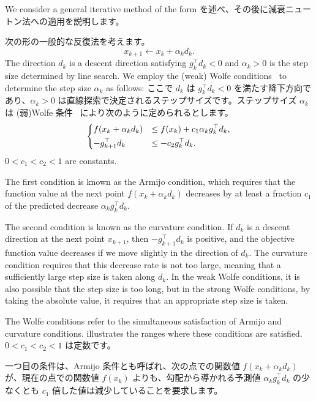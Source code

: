 \documentclass[0_main]{subfiles}
\begin{document}
    We consider a general iterative method of the form
\else
    を述べ、その後に減衰ニュートン法への適用を説明します。

    次の形の一般的な反復法を考えます。
\fi
\begin{equation*}
    x_{k+1} \gets x_k + \alpha_k d_k.
\end{equation*}
\ifEn
    The direction $d_k$ is a descent direction satisfying $g_k^\top d_k < 0$ and $\alpha_k > 0$ is the step size determined by line search. We employ the (weak) Wolfe conditions~\citep[Sec. 3.1]{nocedal1999numerical} to determine the step size $\alpha_k$ as follows:
\else
    ここで $d_k$ は $g_k^\top d_k < 0$ を満たす降下方向であり、$\alpha_k > 0$ は直線探索で決定されるステップサイズです。ステップサイズ $\alpha_k$ は (弱)Wolfe 条件~\citep[Sec. 3.1]{nocedal1999numerical} により次のように定められるとします。
\fi
\begin{equation*}
    \begin{dcases}
        f(x_k + \alpha_k d_k) & \leq f(x_k) + c_1 \alpha_k g_k^\top d_k, \\
        -g_{k+1}^\top d_k     & \leq -c_2 g_k^\top d_k.
    \end{dcases}
\end{equation*}
\ifEn
    $0 < c_1 < c_2 < 1$ are constants.

    The first condition is known as the Armijo condition, which requires that the function value at the next point $f(x_k + \alpha_k d_k)$ decreases by at least a fraction $c_1$ of the predicted decrease $\alpha_k g_k^\top d_k$.

    The second condition is known as the curvature condition. If $d_k$ is a descent direction at the next point $x_{k+1}$, then $-g_{k+1}^\top d_k$ is positive, and the objective function value decreases if we move slightly in the direction of $d_k$. The curvature condition requires that this decrease rate is not too large, meaning that a sufficiently large step size is taken along $d_k$. In the weak Wolfe conditions, it is also possible that the step size is too long, but in the strong Wolfe conditions, by taking the absolute value, it requires that an appropriate step size is taken.

    The Wolfe conditions refer to the simultaneous satisfaction of Armijo and curvature conditions.  illustrates the ranges where these conditions are satisfied.
\else
    $0 < c_1 < c_2 < 1$ は定数です。

    一つ目の条件は、Armijo 条件とも呼ばれ、次の点での関数値 $f(x_k + \alpha_k d_k)$ が、現在の点での関数値 $f(x_k)$ よりも、勾配から導かれる予測値 $\alpha_k g_k^\top d_k$ の少なくとも $c_1$ 倍した値は減少していることを要求します。
\end{document}
